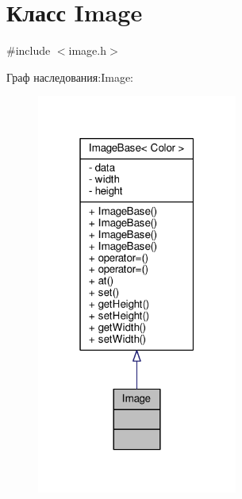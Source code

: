 \hypertarget{class_image}{}\section{Класс Image}
\label{class_image}


{\ttfamily \#include $<$image.\+h$>$}



Граф наследования\+:Image\+:
\nopagebreak
\begin{figure}[H]
\begin{center}
\leavevmode
\includegraphics[width=187pt]{d7/da5/class_image__inherit__graph}
\end{center}
\end{figure}


